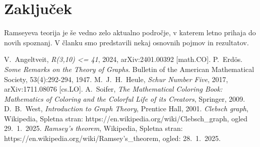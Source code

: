 \documentclass[twoside,11pt]{article}
\begin{document}
\section{Zaključek}
\hspace{\parindent}Ramseyeva teorija je še vedno zelo aktualno področje, v 
katerem letno prihaja do novih spoznanj. 
V članku smo predstavili nekaj osnovnih pojmov in rezultatov.

\newpage
\begin{thebibliography}{99}
     V.~Angeltveit, \emph{R(3,10) <= 41}, 2024, arXiv:2401.00392 [math.CO].
     P.~Erdös. \emph{Some Remarks on the Theory of Graphs}. Bulletin of the
    American Mathematical Society, 53(4):292-294, 1947.
     M.~J.~H.~Heule, \emph{Schur Number Five}, 2017, arXiv:1711.08076 [cs.LO].
     A.~Soifer, \emph{The Mathematical Coloring Book: Mathematics of Coloring and the Colorful Life of its Creators},
    Springer, 2009.
     D.~B.~West, \emph{Introduction to Graph Theory}, Prentice Hall, 2001.
     \emph{Clebsch graph}, Wikipedia, Spletna stran: https://en.wikipedia.org/wiki/Clebsch\_graph, ogled 29.~1.~2025.
     \emph{Ramsey's theorem}, Wikipedia, Spletna stran: https://en.wikipedia.org/wiki/Ramsey's\_theorem, ogled: 28.~1.~2025.
\end{thebibliography}
\end{document}
